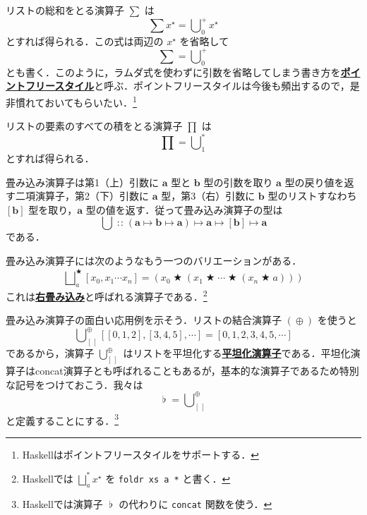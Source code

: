 \documentclass[a4paper,twocolumn]{jsbook}
\newcommand{\programminglanguage}[1]{\textsf{#1}}
\newcommand{\haskell}{\programminglanguage{Haskell}}
\newcommand{\keyword}[1]{{\underline{\textbf{#1}}}}
\newcommand{\code}[1]{\texttt{#1}}
\newcommand{\mEmptyList}{{[\,]}}
\DeclareMathOperator{\mAppend}{\oplus}
\DeclareMathOperator{\mBinOp}{\bigstar}
\DeclareMathOperator{\mConcat}{\flat}
\DeclareMathOperator*{\mFold}{\bigcup}
\DeclareMathOperator*{\mFoldRight}{\bigsqcup}
\DeclareMathOperator{\mIn}{{:\!:}}
\DeclareMathOperator{\mMapsTo}{\mapsto}
\newcommand{\mType}[1]{\mathbf{#1}}
\newcommand{\mListWith}[1]{\left[#1\right]}
\newcommand{\mListType}[1]{\mListWith{\mType{#1}}}
\newcommand{\mList}[1]{{#1}^\mathrm{\star}}
\newcommand{\mProj}[2]{#1\mMapsTo#2}
\begin{document}
リストの総和をとる演算子 $\sum$ は
\begin{equation}
\sum\mList{x}=\mFold^+_0\mList{x}
\end{equation}
とすれば得られる．この式は両辺の $\mList{x}$ を省略して
\begin{equation}
\sum=\mFold^+_0
\end{equation}
とも書く．このように，ラムダ式を使わずに引数を省略してしまう書き方を\keyword{ポイントフリースタイル}と呼ぶ．ポイントフリースタイルは今後も頻出するので，是非慣れておいてもらいたい．\footnote{\haskell はポイントフリースタイルをサポートする．}

リストの要素のすべての積をとる演算子 $\prod$ は
\begin{equation}
\prod=\mFold^*_1
\end{equation}
とすれば得られる．

畳み込み演算子は第1（上）引数に $\mType{a}$ 型と $\mType{b}$ 型の引数を取り $\mType{a}$ 型の戻り値を返す二項演算子，第2（下）引数に $\mType{a}$ 型，第3（右）引数に $\mType{b}$ 型のリストすなわち $\mListType{b}$ 型を取り，$\mType{a}$ 型の値を返す．従って畳み込み演算子の型は
\begin{equation}
\mFold
\mIn{}
\mProj{
  (\mProj{\mType{a}}{\mProj{\mType{b}}{\mType{a}}})
}
{
  \mProj{\mType{a}}{\mProj{\mListType{b}}{\mType{a}}}
}
\end{equation}
である．

畳み込み演算子には次のようなもう一つのバリエーションがある．
\begin{equation}
\mFoldRight^{\mBinOp}_{a}\mListWith{x_0,x_1\dotsb x_n}
=(x_0\mBinOp(x_1\mBinOp\dotsb\mBinOp(x_n\mBinOp a)))
\end{equation}
これは\keyword{右畳み込み}と呼ばれる演算子である．\footnote{\haskell では $\mFoldRight^{*}_a\mList{x}$ を \code{foldr xs a *} と書く．}

畳み込み演算子の面白い応用例を示そう．リストの結合演算子 $(\mAppend)$ を使うと
\begin{equation}
\mFold_\mEmptyList^{\mAppend}\mListWith{\mListWith{0,1,2},\mListWith{3,4,5},\dotsb}=\mListWith{0,1,2,3,4,5,\dotsb}
\end{equation}
であるから，演算子 $\mFold_\mEmptyList^{\mAppend}$ はリストを平坦化する\keyword{平坦化演算子}である．平坦化演算子はconcat演算子とも呼ばれることもあるが，基本的な演算子であるため特別な記号をつけておこう．我々は
\begin{equation}
\mConcat=\mFold_\mEmptyList^{\mAppend}
\end{equation}
と定義することにする．\footnote{\haskell では演算子 $\mConcat$ の代わりに \code{concat} 関数を使う．}
\end{document}
